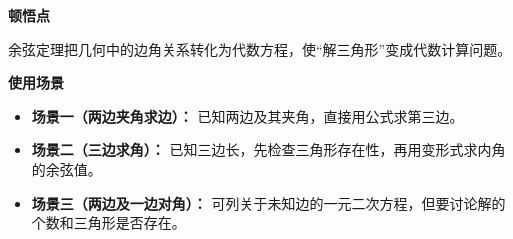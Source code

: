 \begin{explanationbox}
	\medskip
	\textbf{\textcolor{CExplanation}{顿悟点}}

	余弦定理把几何中的边角关系转化为代数方程，使“解三角形”变成代数计算问题。

	\medskip
	\textbf{\textcolor{CExplanation}{使用场景}}
	\begin{itemize}[leftmargin=*, itemsep=0.5em, topsep=0.4em]
		\item \textbf{场景一（两边夹角求边）：} 已知两边及其夹角，直接用公式求第三边。
		\item \textbf{场景二（三边求角）：} 已知三边长，先检查三角形存在性，再用变形式求内角的余弦值。
		\item \textbf{场景三（两边及一边对角）：} 可列关于未知边的一元二次方程，但要讨论解的个数和三角形是否存在。
	\end{itemize}
\end{explanationbox}